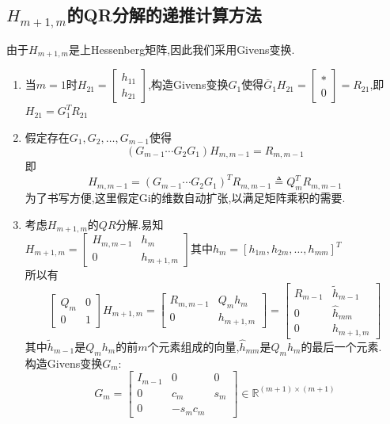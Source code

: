\documentclass[12pt,a4paper]{article}
\begin{document}
\subsection*{$H_{m+1, m}$的QR分解的递推计算方法}
由于$H_{m+1, m}$是上Hessenberg矩阵,因此我们采用Givens变换.\\
\begin{enumerate}[(1)]
	\item 当$m=1$时$H_{21}=\left[\begin{array}{l}{h_{11}} \\ {h_{21}}\end{array}\right]$,构造Givens变换$G_1$使得$\overline{G}_{1} H_{21}=\left[\begin{array}{l}{*} \\ {0}\end{array}\right]=R_{21}$,即$H_{21}=G_{1}^{T} R_{21}$
	\item 假定存在$G_{1}, G_{2}, \ldots, G_{m-1}$使得
	$$
	\left(G_{m-1} \cdots G_{2} G_{1}\right) H_{m, m-1}=R_{m, m-1}
	$$
	即
	$$
	H_{m, m-1}=\left(G_{m-1} \cdots G_{2} G_{1}\right)^{T} R_{m, m-1} \triangleq Q_{m}^{T} R_{m, m-1}
	$$
	为了书写方便,这里假定Gi的维数自动扩张,以满足矩阵乘积的需要.
	\item 考虑$H_{m+1, m}$的$QR$分解.易知\\
	$
	H_{m+1, m}=\left[\begin{array}{cc}{H_{m, m-1}} & {h_{m}} \\ {0} & {h_{m+1, m}}\end{array}\right]
	$其中$h_{m}=\left[h_{1 m}, h_{2 m}, \ldots, h_{m m}\right]^{T}$\\
	所以有
	$$
	\left[\begin{array}{cc}{Q_{m}} & {0} \\ {0} & {1}\end{array}\right] H_{m+1, m}=\left[\begin{array}{cc}{R_{m, m-1}} & {Q_{m} h_{m}} \\ {0} & {h_{m+1, m}}\end{array}\right]=\left[\begin{array}{cc}{R_{m-1}} & {\tilde{h}_{m-1}} \\ {0} & {\hat{h}_{m m}} \\ {0} & {h_{m+1, m}}\end{array}\right]
	$$
	其中$\tilde{h}_{m-1}$是$Q_{m} h_{m}$的前$m$个元素组成的向量,$\hat{h}_{m m}$是$Q_{m} h_{m}$的最后一个元素.\\
	构造Givens变换$G_{m}$:
	$$
	G_{m}=\left[\begin{array}{ccc}{I_{m-1}} & {0} & {0} \\ {0} & {c_{m}} & {s_{m}} \\ {0} & {-s_{m} c_{m}}\end{array}\right] \in \mathbb{R}^{(m+1) \times(m+1)}
$$
\end{enumerate}
\end{document}
